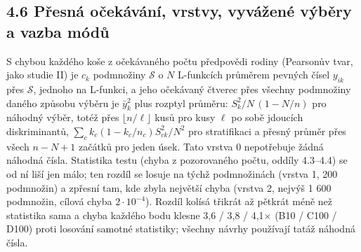 \documentclass[
  10pt,
]{article}
\begin{document}
\hypertarget{pux159esnuxe1-oux10dekuxe1vuxe1nuxed-vrstvy-vyvuxe1ux17eenuxe9-vuxfdbux11bry-a-vazba-muxf3dux16f}{%
\subsection{4.6 Přesná očekávání, vrstvy, vyvážené výběry a vazba
módů}\label{pux159esnuxe1-oux10dekuxe1vuxe1nuxed-vrstvy-vyvuxe1ux17eenuxe9-vuxfdbux11bry-a-vazba-muxf3dux16f}}

S chybou každého koše z očekávaného počtu předpovědi rodiny (Pearsonův
tvar, jako studie II) je \(c_k\) podmnožiny \(\mathcal S\) o \(N\)
L-funkcích průměrem pevných čísel \(y_{ik}\) přes \(\mathcal S\),
jednoho na L-funkci, a jeho očekávaný čtverec přes všechny podmnožiny
daného způsobu výběru je \(\bar y_k^2\) plus rozptyl průměru:
\(S_k^2/N\,(1 - N/n)\) pro náhodný výběr, totéž přes
\(\lfloor n/\ell\rfloor\) kusů pro kusy \(\ell\) po sobě jdoucích
diskriminantů, \(\sum_c k_c(1 - k_c/n_c)S_{ck}^2/N^2\) pro stratifikaci
a přesný průměr přes všech \(n - N + 1\) začátků pro jeden úsek. Tato
vrstva 0 nepotřebuje žádná náhodná čísla. Statistika testu (chyba z
pozorovaného počtu, oddíly 4.3--4.4) se od ní liší jen málo; ten rozdíl
se losuje na týchž podmnožinách (vrstva 1, 200 podmnožin) a zpřesní tam,
kde zbyla největší chyba (vrstva 2, nejvýš 1 600 podmnožin, cílová chyba
\(2\cdot10^{-4}\)). Rozdíl kolísá třikrát až pětkrát méně než statistika
sama a chyba každého bodu klesne 3,6 / 3,8 / 4,1× (B10 / C100 / D100)
proti losování samotné statistiky; všechny návrhy používají tatáž
náhodná čísla.
\end{document}
